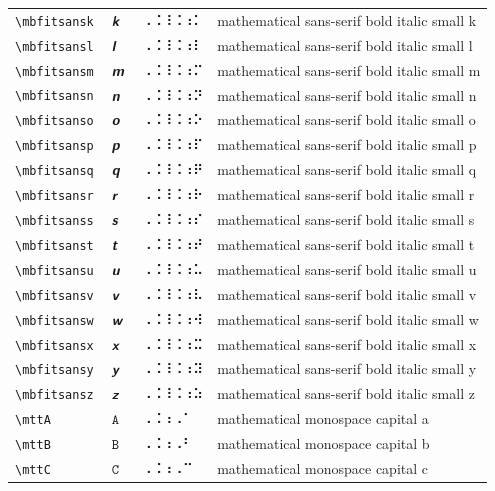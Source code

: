 \documentclass[oneside]{article}
\begin{document}
\begin{longtable}{llll}
\verb|\mbfitsansk| & $\mbfitsansk$ &  ⠠⠨⠸⠨⠰⠅  & {mathematical sans-serif bold italic small k} \\[2ex]
\verb|\mbfitsansl| & $\mbfitsansl$ &  ⠠⠨⠸⠨⠰⠇  & {mathematical sans-serif bold italic small l} \\[2ex]
\verb|\mbfitsansm| & $\mbfitsansm$ &  ⠠⠨⠸⠨⠰⠍  & {mathematical sans-serif bold italic small m} \\[2ex]
\verb|\mbfitsansn| & $\mbfitsansn$ &  ⠠⠨⠸⠨⠰⠝  & {mathematical sans-serif bold italic small n} \\[2ex]
\verb|\mbfitsanso| & $\mbfitsanso$ &  ⠠⠨⠸⠨⠰⠕  & {mathematical sans-serif bold italic small o} \\[2ex]
\verb|\mbfitsansp| & $\mbfitsansp$ &  ⠠⠨⠸⠨⠰⠏  & {mathematical sans-serif bold italic small p} \\[2ex]
\verb|\mbfitsansq| & $\mbfitsansq$ &  ⠠⠨⠸⠨⠰⠟  & {mathematical sans-serif bold italic small q} \\[2ex]
\verb|\mbfitsansr| & $\mbfitsansr$ &  ⠠⠨⠸⠨⠰⠗  & {mathematical sans-serif bold italic small r} \\[2ex]
\verb|\mbfitsanss| & $\mbfitsanss$ &  ⠠⠨⠸⠨⠰⠎  & {mathematical sans-serif bold italic small s} \\[2ex]
\verb|\mbfitsanst| & $\mbfitsanst$ &  ⠠⠨⠸⠨⠰⠞  & {mathematical sans-serif bold italic small t} \\[2ex]
\verb|\mbfitsansu| & $\mbfitsansu$ &  ⠠⠨⠸⠨⠰⠥  & {mathematical sans-serif bold italic small u} \\[2ex]
\verb|\mbfitsansv| & $\mbfitsansv$ &  ⠠⠨⠸⠨⠰⠧  & {mathematical sans-serif bold italic small v} \\[2ex]
\verb|\mbfitsansw| & $\mbfitsansw$ &  ⠠⠨⠸⠨⠰⠺  & {mathematical sans-serif bold italic small w} \\[2ex]
\verb|\mbfitsansx| & $\mbfitsansx$ &  ⠠⠨⠸⠨⠰⠭  & {mathematical sans-serif bold italic small x} \\[2ex]
\verb|\mbfitsansy| & $\mbfitsansy$ &  ⠠⠨⠸⠨⠰⠽  & {mathematical sans-serif bold italic small y} \\[2ex]
\verb|\mbfitsansz| & $\mbfitsansz$ &  ⠠⠨⠸⠨⠰⠵  & {mathematical sans-serif bold italic small z} \\[2ex]
\verb|\mttA| & $\mttA$ &  ⠠⠨⠰⠠⠁  & {mathematical monospace capital a} \\[2ex]
\verb|\mttB| & $\mttB$ &  ⠠⠨⠰⠠⠃  & {mathematical monospace capital b} \\[2ex]
\verb|\mttC| & $\mttC$ &  ⠠⠨⠰⠠⠉  & {mathematical monospace capital c} \\[2ex]

\end{longtable}
\end{document}
